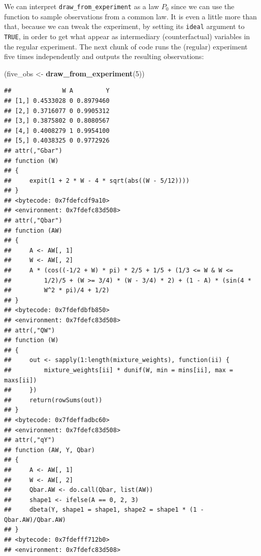 \documentclass[]{article}
\newenvironment{Shaded}{\begin{snugshade}}{\end{snugshade}}
\newcommand{\DecValTok}[1]{\textcolor[rgb]{0.00,0.00,0.81}{#1}}
\newcommand{\KeywordTok}[1]{\textcolor[rgb]{0.13,0.29,0.53}{\textbf{#1}}}
\newcommand{\NormalTok}[1]{#1}
\newcommand{\StringTok}[1]{\textcolor[rgb]{0.31,0.60,0.02}{#1}}
\theoremstyle{definition}
\theoremstyle{definition}
\theoremstyle{definition}
\theoremstyle{remark}
\begin{document}
We can interpret \texttt{draw\_from\_experiment} as a law \(P_{0}\)
since we can use the function to sample observations from a common law.
It is even a little more than that, because we can tweak the experiment,
by setting its \texttt{ideal} argument to \texttt{TRUE}, in order to get
what appear as intermediary (counterfactual) variables in the regular
experiment. The next chunk of code runs the (regular) experiment five
times independently and outputs the resulting observations:

\begin{Shaded}
\begin{Highlighting}[]
\NormalTok{(five_obs <-}\StringTok{ }\KeywordTok{draw_from_experiment}\NormalTok{(}\DecValTok{5}\NormalTok{))}
\end{Highlighting}
\end{Shaded}

\begin{verbatim}
##              W A         Y
## [1,] 0.4533028 0 0.8979460
## [2,] 0.3716077 0 0.9905312
## [3,] 0.3875802 0 0.8080567
## [4,] 0.4008279 1 0.9954100
## [5,] 0.4038325 0 0.9772926
## attr(,"Gbar")
## function (W) 
## {
##     expit(1 + 2 * W - 4 * sqrt(abs((W - 5/12))))
## }
## <bytecode: 0x7fdefcdf9a10>
## <environment: 0x7fdefc83d508>
## attr(,"Qbar")
## function (AW) 
## {
##     A <- AW[, 1]
##     W <- AW[, 2]
##     A * (cos((-1/2 + W) * pi) * 2/5 + 1/5 + (1/3 <= W & W <= 
##         1/2)/5 + (W >= 3/4) * (W - 3/4) * 2) + (1 - A) * (sin(4 * 
##         W^2 * pi)/4 + 1/2)
## }
## <bytecode: 0x7fdefdbfb850>
## <environment: 0x7fdefc83d508>
## attr(,"QW")
## function (W) 
## {
##     out <- sapply(1:length(mixture_weights), function(ii) {
##         mixture_weights[ii] * dunif(W, min = mins[ii], max = maxs[ii])
##     })
##     return(rowSums(out))
## }
## <bytecode: 0x7fdeffadbc60>
## <environment: 0x7fdefc83d508>
## attr(,"qY")
## function (AW, Y, Qbar) 
## {
##     A <- AW[, 1]
##     W <- AW[, 2]
##     Qbar.AW <- do.call(Qbar, list(AW))
##     shape1 <- ifelse(A == 0, 2, 3)
##     dbeta(Y, shape1 = shape1, shape2 = shape1 * (1 - Qbar.AW)/Qbar.AW)
## }
## <bytecode: 0x7fdefff712b0>
## <environment: 0x7fdefc83d508>
\end{verbatim}
\end{document}
